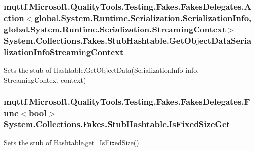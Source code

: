 \hypertarget{class_system_1_1_collections_1_1_fakes_1_1_stub_hashtable_a699d4b82c1710dfca21b60a80fcc3743}{
\subsubsection[{Get\-Object\-Data\-Serialization\-Info\-Streaming\-Context}]{\setlength{\rightskip}{0pt plus 5cm}mqttf.\-Microsoft.\-Quality\-Tools.\-Testing.\-Fakes.\-Fakes\-Delegates.\-Action$<$global.\-System.\-Runtime.\-Serialization.\-Serialization\-Info, global.\-System.\-Runtime.\-Serialization.\-Streaming\-Context$>$ System.\-Collections.\-Fakes.\-Stub\-Hashtable.\-Get\-Object\-Data\-Serialization\-Info\-Streaming\-Context}}\label{class_system_1_1_collections_1_1_fakes_1_1_stub_hashtable_a699d4b82c1710dfca21b60a80fcc3743}


Sets the stub of Hashtable.\-Get\-Object\-Data(\-Serialization\-Info info, Streaming\-Context context)

\hypertarget{class_system_1_1_collections_1_1_fakes_1_1_stub_hashtable_a48617c1b883808631b14644d1a56867b}{
\subsubsection[{Is\-Fixed\-Size\-Get}]{\setlength{\rightskip}{0pt plus 5cm}mqttf.\-Microsoft.\-Quality\-Tools.\-Testing.\-Fakes.\-Fakes\-Delegates.\-Func$<$bool$>$ System.\-Collections.\-Fakes.\-Stub\-Hashtable.\-Is\-Fixed\-Size\-Get}}\label{class_system_1_1_collections_1_1_fakes_1_1_stub_hashtable_a48617c1b883808631b14644d1a56867b}


Sets the stub of Hashtable.\-get\-\_\-\-Is\-Fixed\-Size()

